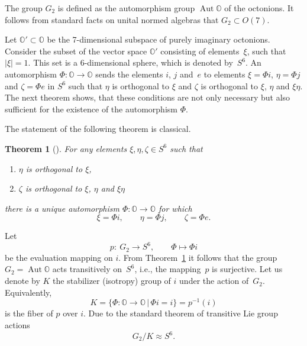 \documentclass[10pt,a4paper]{amsart}
\numberwithin{equation}{section}
\newtheorem{Theorem}{Theorem}[section]
\DeclareMathOperator{\Aut}{Aut}
\newcommand{\SO}{\mathbb{O}} %
\begin{document}
The group $G_2$ is defined as the automorphism group $\Aut \SO $ of the octonions. It follows from standard facts on unital normed algebras that $ G_2 \subset O(7)$.

Let $\SO' \subset \SO$ be the 7-dimensional subspace of purely imaginary octonions. Consider the subset of the vector space $\SO'$ consisting of elements~$\xi$, such that $|\xi|=1$. This set is a 6-dimensional sphere, which is denoted by~$S^6$. An automorphism $\Phi \colon \SO \rightarrow \SO$ sends the elements $i$, $j$ and~$e$ to elements $\xi=\Phi i$, $\eta= \Phi j$ and $\zeta = \Phi e$ in $S^6$ such that $\eta$ is orthogonal to $\xi$ and $\zeta$ is orthogonal to $\xi$, $\eta$ and $\xi \eta$. The next theorem shows, that these conditions are not only necessary but also sufficient for the existence of the automorphism $\Phi$.

The statement of the following theorem is classical.
\begin{Theorem}[{\cite[p.~309]{postnikov1986lie}}] \label{thm:autcorr}
 For any elements $\xi, \eta, \zeta \in S^6$ such that
 \begin{enumerate}\itemsep=0pt
 \item[$(a)$] $\eta$ is orthogonal to $\xi$,
 \item[$(b)$] $\zeta$ is orthogonal to $\xi$, $\eta$ and $\xi \eta$
 \end{enumerate}
 there is a unique automorphism $\Phi\colon \SO \rightarrow \SO$ for which \[ \xi=\Phi i,\qquad \eta= \Phi j,\qquad \zeta = \Phi e.\]
\end{Theorem}

Let
\[p\colon \ G_2 \rightarrow S^6,\qquad \Phi \mapsto \Phi i\]
be the evaluation mapping on $i$. From Theorem~\ref{thm:autcorr} it follows that the group $G_2 = \Aut \SO $ acts transitively on~$S^6$, i.e., the mapping~$p$ is surjective. Let us denote by $K$ the stabilizer (isotropy) group of $i$ under the action of~$G_2$. Equivalently,
\[K=\{\Phi\colon \SO \rightarrow \SO \, | \, \Phi i = i \}=p^{-1}(i)\]
is the fiber of $p$ over $i$. Due to the standard theorem \cite[Theorem~9.24]{lee2003introduction} of transitive Lie group actions
\[G_2/K \approx S^6.\]
\end{document}
